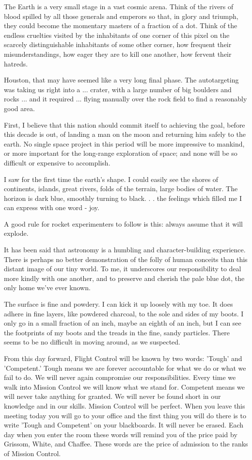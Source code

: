 The Earth is a very small stage in a vast cosmic arena. Think of the rivers of blood spilled by all those generals and emperors so that, in glory and triumph, they could become the momentary masters of a fraction of a dot. Think of the endless cruelties visited by the inhabitants of one corner of this pixel on the scarcely distinguishable inhabitants of some other corner, how frequent their misunderstandings, how eager they are to kill one another, how fervent their hatreds.

Houston, that may have seemed like a very long final phase. The autotargeting was taking us right into a ... crater, with a large number of big boulders and rocks ... and it required ... flying manually over the rock field to find a reasonably good area.

First, I believe that this nation should commit itself to achieving the goal, before this decade is out, of landing a man on the moon and returning him safely to the earth. No single space project in this period will be more impressive to mankind, or more important for the long-range exploration of space; and none will be so difficult or expensive to accomplish.

I saw for the first time the earth's shape. I could easily see the shores of continents, islands, great rivers, folds of the terrain, large bodies of water. The horizon is dark blue, smoothly turning to black. . . the feelings which filled me I can express with one word - joy.

A good rule for rocket experimenters to follow is this: always assume that it will explode.

It has been said that astronomy is a humbling and character-building experience. There is perhaps no better demonstration of the folly of human conceits than this distant image of our tiny world. To me, it underscores our responsibility to deal more kindly with one another, and to preserve and cherish the pale blue dot, the only home we've ever known.

The surface is fine and powdery. I can kick it up loosely with my toe. It does adhere in fine layers, like powdered charcoal, to the sole and sides of my boots. I only go in a small fraction of an inch, maybe an eighth of an inch, but I can see the footprints of my boots and the treads in the fine, sandy particles. There seems to be no difficult in moving around, as we suspected.

From this day forward, Flight Control will be known by two words: 'Tough' and 'Competent.' Tough means we are forever accountable for what we do or what we fail to do. We will never again compromise our responsibilities. Every time we walk into Mission Control we will know what we stand for. Competent means we will never take anything for granted. We will never be found short in our knowledge and in our skills. Mission Control will be perfect. When you leave this meeting today you will go to your office and the first thing you will do there is to write 'Tough and Competent' on your blackboards. It will never be erased. Each day when you enter the room these words will remind you of the price paid by Grissom, White, and Chaffee. These words are the price of admission to the ranks of Mission Control.

